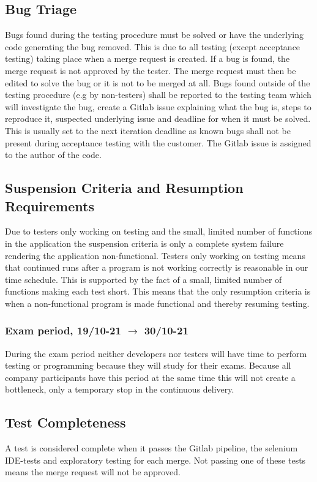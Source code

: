 \subsection{Bug Triage}
Bugs found during the testing procedure must be solved or have the underlying code generating the bug removed. This is due to all testing (except acceptance testing) taking place when a merge request is created. If a bug is found, the merge request is not approved by the tester. The merge request must then be edited to solve the bug or it is not to be merged at all. Bugs found outside of the testing procedure (e.g by non-testers) shall be reported to the testing team which will investigate the bug, create a Gitlab issue explaining what the bug is, steps to reproduce it, suspected underlying issue and deadline for when it must be solved. This is usually set to the next iteration deadline as known bugs shall not be present during acceptance testing with the customer. The Gitlab issue is assigned to the author of the code. 

\subsection{Suspension Criteria and Resumption Requirements}
Due to testers only working on testing and the small, limited number of functions in the application the suspension criteria is only a complete system failure rendering the application non-functional. Testers only working on testing means that continued runs after a program is not working correctly is reasonable in our time schedule. This is supported by the fact of a small, limited number of functions making each test short. This means that the only resumption criteria is when a non-functional program is made functional and thereby resuming testing.    
\subsubsection{Exam period, 19/10-21 $\xrightarrow{}$ 30/10-21}
During the exam period neither developers nor testers will have time to perform testing or programming because they will study for their exams. Because all company participants have this period at the same time this will not create a bottleneck, only a temporary stop in the continuous delivery.
\subsection{Test Completeness}
A test is considered complete when it passes the Gitlab pipeline, the selenium IDE-tests and exploratory testing for each merge. Not passing one of these tests means the merge request will not be approved.

